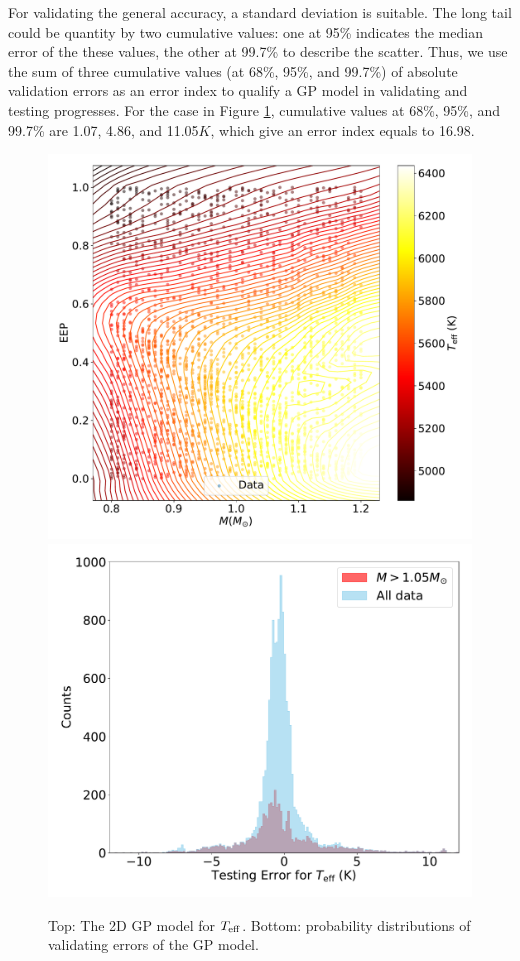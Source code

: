 %
For validating the general accuracy, a standard deviation is suitable. The long tail could be quantity by two cumulative values: one at 95\% indicates the median error of the these values, the other at 99.7\% to describe the scatter. Thus, we use the sum of three cumulative values (at 68\%, 95\%, and 99.7\%) of absolute validation errors as an error index to qualify a GP model in validating and testing progresses. For the case in Figure \ref{fig:2dtest}, cumulative values at 68\%, 95\%, and 99.7\% are 1.07, 4.86, and 11.05$K$, which give an error index equals to 16.98. 

\begin{figure}
	\includegraphics[width=1.0\columnwidth]{2d_GPmodel_function.pdf}
	\includegraphics[width=1.0\columnwidth]{2d_testing_hist_effective_T.pdf}	
    \caption{Top: The 2D GP model for $T_{\rm eff}$. Bottom: probability distributions of validating errors of the GP model. }  
    \label{fig:2dtest}
\end{figure}


